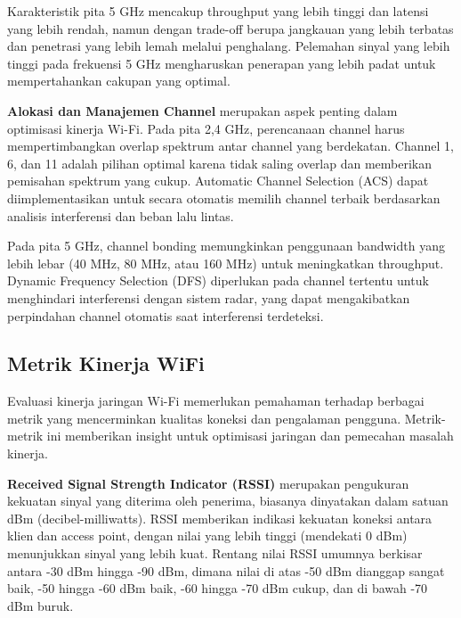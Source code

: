 Karakteristik pita 5 GHz mencakup throughput yang lebih tinggi dan latensi yang lebih rendah, namun dengan trade-off berupa jangkauan yang lebih terbatas dan penetrasi yang lebih lemah melalui penghalang. Pelemahan sinyal yang lebih tinggi pada frekuensi 5 GHz mengharuskan penerapan yang lebih padat untuk mempertahankan cakupan yang optimal.

\textbf{Alokasi dan Manajemen Channel} merupakan aspek penting dalam optimisasi kinerja Wi-Fi. Pada pita 2,4 GHz, perencanaan channel harus mempertimbangkan overlap spektrum antar channel yang berdekatan. Channel 1, 6, dan 11 adalah pilihan optimal karena tidak saling overlap dan memberikan pemisahan spektrum yang cukup. Automatic Channel Selection (ACS) dapat diimplementasikan untuk secara otomatis memilih channel terbaik berdasarkan analisis interferensi dan beban lalu lintas.

Pada pita 5 GHz, channel bonding memungkinkan penggunaan bandwidth yang lebih lebar (40 MHz, 80 MHz, atau 160 MHz) untuk meningkatkan throughput. Dynamic Frequency Selection (DFS) diperlukan pada channel tertentu untuk menghindari interferensi dengan sistem radar, yang dapat mengakibatkan perpindahan channel otomatis saat interferensi terdeteksi.

\subsection{Metrik Kinerja WiFi}

Evaluasi kinerja jaringan Wi-Fi memerlukan pemahaman terhadap berbagai metrik yang mencerminkan kualitas koneksi dan pengalaman pengguna. Metrik-metrik ini memberikan insight untuk optimisasi jaringan dan pemecahan masalah kinerja.


\textbf{Received Signal Strength Indicator (RSSI)} merupakan pengukuran kekuatan sinyal yang diterima oleh penerima, biasanya dinyatakan dalam satuan dBm (decibel-milliwatts). RSSI memberikan indikasi kekuatan koneksi antara klien dan access point, dengan nilai yang lebih tinggi (mendekati 0 dBm) menunjukkan sinyal yang lebih kuat. Rentang nilai RSSI umumnya berkisar antara -30 dBm hingga -90 dBm, dimana nilai di atas -50 dBm dianggap sangat baik, -50 hingga -60 dBm baik, -60 hingga -70 dBm cukup, dan di bawah -70 dBm buruk.

